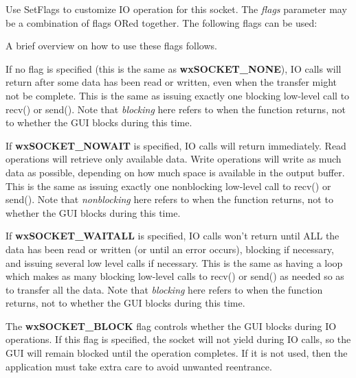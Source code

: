 %
%
\label{wxsocketbasesetflags}


Use SetFlags to customize IO operation for this socket.
The {\it flags} parameter may be a combination of flags ORed together.
The following flags can be used:

\twocolwidtha{7cm}
\begin{twocollist}\itemsep=0pt
\end{twocollist}

A brief overview on how to use these flags follows.

If no flag is specified (this is the same as {\bf wxSOCKET\_NONE}),
IO calls will return after some data has been read or written, even
when the transfer might not be complete. This is the same as issuing
exactly one blocking low-level call to recv() or send(). Note
that {\it blocking} here refers to when the function returns, not
to whether the GUI blocks during this time.

If {\bf wxSOCKET\_NOWAIT} is specified, IO calls will return immediately.
Read operations will retrieve only available data. Write operations will
write as much data as possible, depending on how much space is available
in the output buffer. This is the same as issuing exactly one nonblocking
low-level call to recv() or send(). Note that {\it nonblocking} here
refers to when the function returns, not to whether the GUI blocks during
this time.

If {\bf wxSOCKET\_WAITALL} is specified, IO calls won't return until ALL
the data has been read or written (or until an error occurs), blocking if
necessary, and issuing several low level calls if necessary. This is the
same as having a loop which makes as many blocking low-level calls to
recv() or send() as needed so as to transfer all the data. Note
that {\it blocking} here refers to when the function returns, not
to whether the GUI blocks during this time.

The {\bf wxSOCKET\_BLOCK} flag controls whether the GUI blocks during
IO operations. If this flag is specified, the socket will not yield
during IO calls, so the GUI will remain blocked until the operation
completes. If it is not used, then the application must take extra
care to avoid unwanted reentrance.

